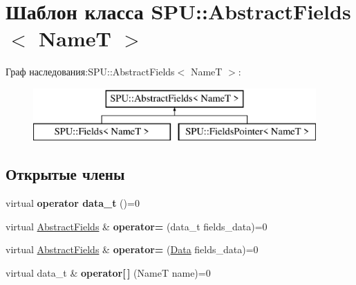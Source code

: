 \hypertarget{class_s_p_u_1_1_abstract_fields}{}\section{Шаблон класса S\+PU\+:\+:Abstract\+Fields$<$ NameT $>$}
\label{class_s_p_u_1_1_abstract_fields}
Граф наследования\+:S\+PU\+:\+:Abstract\+Fields$<$ NameT $>$\+:\begin{figure}[H]
\begin{center}
\leavevmode
\includegraphics[height=2.000000cm]{class_s_p_u_1_1_abstract_fields}
\end{center}
\end{figure}
\subsection*{Открытые члены}
\begin{DoxyCompactItemize}
\item 
\mbox{\label{class_s_p_u_1_1_abstract_fields_ab6d58eb6fe239d4e56d3214c7e8ad10d}} 
virtual {\bfseries operator data\+\_\+t} ()=0
\item 
\mbox{\label{class_s_p_u_1_1_abstract_fields_a321cce6de1e8d8597f271f45a273c0a6}} 
virtual \hyperlink{class_s_p_u_1_1_abstract_fields}{Abstract\+Fields} \& {\bfseries operator=} (data\+\_\+t fields\+\_\+data)=0
\item 
\mbox{\label{class_s_p_u_1_1_abstract_fields_a5634bfa57050c2bb3ac57d5b5ce9e479}} 
virtual \hyperlink{class_s_p_u_1_1_abstract_fields}{Abstract\+Fields} \& {\bfseries operator=} (\hyperlink{class_s_p_u_1_1_fields_data}{Data} fields\+\_\+data)=0
\item 
\mbox{\label{class_s_p_u_1_1_abstract_fields_aca06b1d47b10b3dbca1059c81e70e85c}} 
virtual data\+\_\+t \& {\bfseries operator\mbox{[}$\,$\mbox{]}} (NameT name)=0
\end{DoxyCompactItemize}
